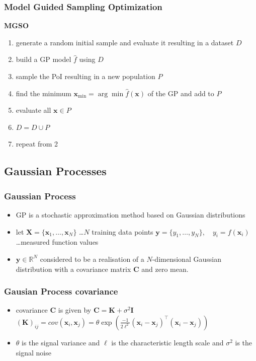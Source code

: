 \documentclass[sans,mathserif]{beamer}
\newcommand{\xx}{\mathrm{\mathbf{x}}}
\newcommand{\XX}{\mathrm{\mathbf{X}}}
\newcommand{\yy}{\mathrm{\mathbf{y}}}
\newcommand{\R}{\mathrm{\mathbb{R}}}
\newcommand{\CC}{\mathrm{\mathbf{C}}}
\newcommand{\KK}{\mathrm{\mathbf{K}}}
\newcommand{\II}{\mathrm{\mathbf{I}}}
\newcommand{\blue}[1]{{\color{blue} #1}}
\begin{document}
\begin{frame}
  \frametitle{Model Guided Sampling Optimization}

  \textbf{MGSO}
  \begin{enumerate}
    \item generate a random initial sample and evaluate it resulting in a dataset $D$
    \item build a GP model $\hat{f}$ using $D$
    \item sample the PoI resulting in a new population $P$
    \item find the minimum $\xx_{\min} = \arg\min \hat{f}(\xx)$ of the GP and add to $P$
    \item evaluate all $\xx \in P$
    \item $D = D \cup P$
    \item repeat from 2
  \end{enumerate}
\end{frame}

\subsection{Gaussian Processes}

\begin{frame}
  \frametitle{Gaussian Process}
  \begin{itemize}
    \item GP is a stochastic approximation method based on Gaussian distributions
    \item let \newline
        $\XX = \{\xx_1, \dots, \xx_N\}$ \dots $N$ training data points
        $\yy = \{y_1, \dots, y_N \}, \quad y_i = f(\xx_i)\ $ \dots measured function values
    \item $\yy \in \R^N$ considered to be a realisation of a \blue{$N$-dimensional} Gaussian distribution
        with a covariance matrix $\CC$ and zero mean.
  \end{itemize}
\end{frame}

\begin{frame}
  \frametitle{Gausian Process covariance}
  \begin{itemize}
    \item covariance $\CC$ is given by \newline
        $\CC = \KK + \sigma^2 \II$ \newline
        $(\KK)_{ij} = cov(\xx_i, \xx_j) = \theta \exp(\frac{-1}{2\ell^2} (\xx_i - \xx_j)^\top (\xx_i - \xx_j)) $
    \item $\theta$ is the \blue{signal variance} and $\ell$ is the \blue{characteristic length scale} and $\sigma^2$
        is the \blue{signal noise}
  \end{itemize}
\end{frame}
\end{document}
